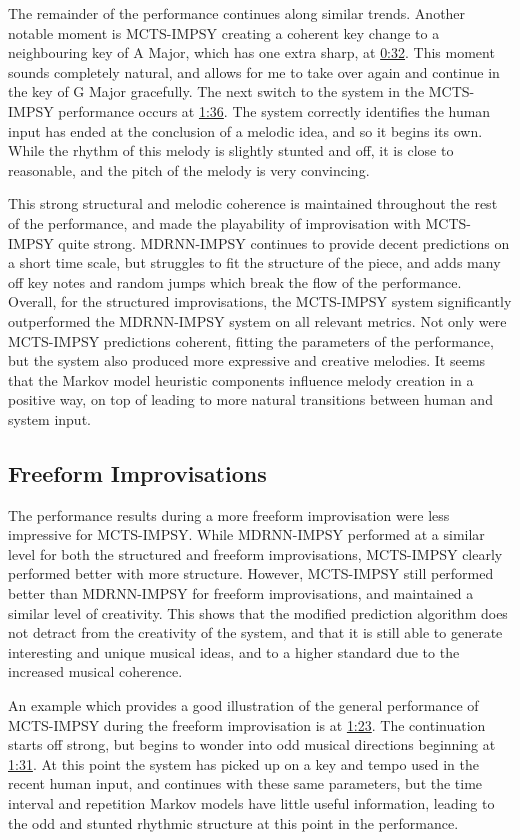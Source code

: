 The remainder of the performance continues along similar trends. Another notable moment is MCTS-IMPSY creating a coherent key change to a neighbouring key of A Major, which has one extra sharp, at \href{https://youtu.be/0DQhZ1FaKT4&t=19s}{0:32}. This moment sounds completely natural, and allows for me to take over again and continue in the key of G Major gracefully. The next switch to the system in the MCTS-IMPSY performance occurs at \href{https://youtu.be/0DQhZ1FaKT4&t=1m36s}{1:36}. The system correctly identifies the human input has ended at the conclusion of a melodic idea, and so it begins its own. While the rhythm of this melody is slightly stunted and off, it is close to reasonable, and the pitch of the melody is very convincing.

This strong structural and melodic coherence is maintained throughout the rest of the performance, and made the playability of improvisation with MCTS-IMPSY quite strong. MDRNN-IMPSY continues to provide decent predictions on a short time scale, but struggles to fit the structure of the piece, and adds many off key notes and random jumps which break the flow of the performance. Overall, for the structured improvisations, the MCTS-IMPSY system significantly outperformed the MDRNN-IMPSY system on all relevant metrics. Not only were MCTS-IMPSY predictions coherent, fitting the parameters of the performance, but the system also produced more expressive and creative melodies. It seems that the Markov model heuristic components influence melody creation in a positive way, on top of leading to more natural transitions between human and system input.

\subsection{Freeform Improvisations}
The performance results during a more freeform improvisation were less impressive for MCTS-IMPSY. While MDRNN-IMPSY performed at a similar level for both the structured and freeform improvisations, MCTS-IMPSY clearly performed better with more structure. However, MCTS-IMPSY still performed better than MDRNN-IMPSY for freeform improvisations, and maintained a similar level of creativity. This shows that the modified prediction algorithm does not detract from the creativity of the system, and that it is still able to generate interesting and unique musical ideas, and to a higher standard due to the increased musical coherence.

An example which provides a good illustration of the general performance of MCTS-IMPSY during the freeform improvisation is at \href{https://youtu.be/2op_NtcvT8M&t=1m23s}{1:23}. The continuation starts off strong, but begins to wonder into odd musical directions beginning at \href{https://youtu.be/2op_NtcvT8M&t=1m23s}{1:31}. At this point the system has picked up on a key and tempo used in the recent human input, and continues with these same parameters, but the time interval and repetition Markov models have little useful information, leading to the odd and stunted rhythmic structure at this point in the performance. 


